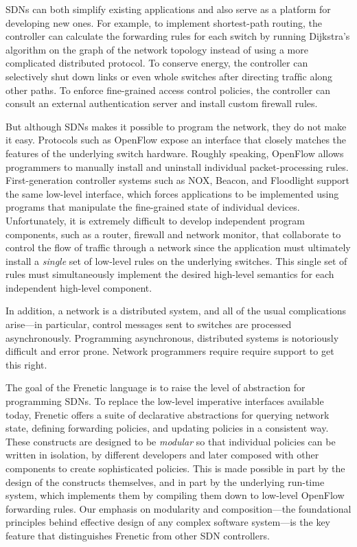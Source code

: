 \documentclass{article}
\begin{document}
SDNs can both simplify existing applications and also serve as a
platform for developing new ones. For example, to implement
shortest-path routing, the controller can calculate the forwarding
rules for each switch by running Dijkstra’s algorithm on the graph of
the network topology instead of using a more complicated distributed
protocol. To conserve energy, the controller can selectively shut down
links or even whole switches after directing trafﬁc along other
paths. To enforce ﬁne-grained access control policies, the controller
can consult an external authentication server and install custom
firewall rules.

But although SDNs makes it possible to program the network, they do
not make it easy. Protocols such as OpenFlow expose an interface that
closely matches the features of the underlying switch
hardware. Roughly speaking, OpenFlow allows programmers to manually
install and uninstall individual packet-processing rules.
First-generation controller systems such as NOX, Beacon, and
Floodlight support the same low-level interface, which forces
applications to be implemented using programs that manipulate the
fine-grained state of individual devices.  Unfortunately, it is
extremely difficult to develop independent program components, such as
a router, firewall and network monitor, that collaborate to control
the flow of traffic through a network since the application must
ultimately install a \emph{single} set of low-level rules on the underlying
switches.  This single set of rules must simultaneously implement the
desired high-level semantics for each independent high-level
component.

In addition, a network is a distributed system, and all of the usual
complications arise—in particular, control messages sent to switches
are processed asynchronously. Programming asynchronous, distributed
systems is notoriously difficult and error prone.  Network programmers
require require support to get this right.

The goal of the Frenetic language is to raise the level of abstraction
for programming SDNs. To replace the low-level imperative interfaces
available today, Frenetic offers a suite of declarative abstractions
for querying network state, deﬁning forwarding policies, and updating
policies in a consistent way.  These constructs are designed to be
\emph{modular} so that individual policies can be written in isolation, by
different developers and later composed with other components to
create sophisticated policies. This is made possible in part by the
design of the constructs themselves, and in part by the underlying
run-time system, which implements them by compiling them down to
low-level OpenFlow forwarding rules.  Our emphasis on modularity and
composition—the foundational principles behind effective design of any
complex software system—is the key feature that distinguishes Frenetic
from other SDN controllers.
\end{document}
